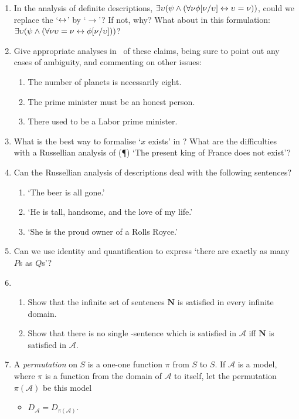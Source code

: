 {\begin{enumerate}
\item In the analysis of definite descriptions, $\exists \upsilon (\psi \wedge (\forall \nu \phi[\nu/\upsilon] \leftrightarrow \upsilon=\nu))$,  could we replace the `$\leftrightarrow$' by `$\to$'? If not, why? What about in this formulation: $\exists \upsilon (\psi \wedge (\forall \nu \upsilon=\nu \leftrightarrow \phi[\nu/\upsilon]))$?
\item Give appropriate analyses in \lequ\ of these claims, being sure to point out any cases of ambiguity, and commenting on other issues: \begin{enumerate}
	\item The number of planets is necessarily eight.
	\item The prime minister must be an honest person.
	\item There used to be  a Labor prime minister.
\end{enumerate}
\item What is the best way to formalise `$x$ exists' in \lequ? What are the difficulties with a Russellian analysis of (\P) `The present king of France does not exist'?
\item Can the Russellian analysis of descriptions deal with the following sentences? \begin{enumerate}
	\item `The beer is all gone.'
	\item `He is tall, handsome, and the love of my life.'
	\item `She is the proud owner of a Rolls Royce.'
\end{enumerate}
\item Can we use identity and quantification to express `there are exactly as many $P$s as $Q$s'?
\item \begin{enumerate}\item Show that the infinite set of sentences $\mathbf{N}$ is satisfied in every infinite domain.
\item Show that there is no single \lequ-sentence which is satisfied in $\mathscr{A}$ iff $\mathbf{N}$ is satisfied in $\mathscr{A}$.
\end{enumerate}
\item A \emph{permutation} on $S$ is a one-one function $\pi$ from $S$ to $S$. If $\mathscr{A}$ is a model, where $\pi$ is a function from the domain of $\mathscr{A}$ to itself, let the permutation $\pi(\mathscr{A})$ be this model \begin{itemize}
	\item $D_{\mathscr{A}}=D_{\pi(\mathscr{A})}$.

\end{itemize}
\end{enumerate}}
